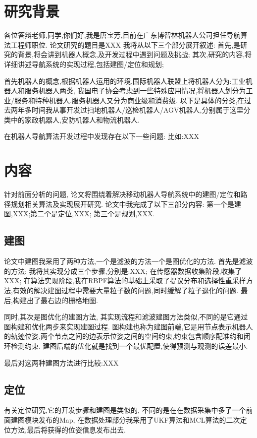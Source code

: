 \section{研究背景}
各位答辩老师,同学,你们好,我是唐宝芳,目前在广东博智林机器人公司担任导航算法工程师职位.
论文研究的题目是XXX \qquad
我将从以下三个部分展开叙述:
首先,是研究的背景,将会讲到机器人概念,及开发过程中遇到问题及挑战;
其次,研究的内容,将详细讲述导航系统的实现过程,包括建图/定位和规划;

首先机器人的概念,根据机器人运用的环境,国际机器人联盟上将机器人分为:工业机器人和服务机器人两类,
我国电子协会考虑到一些特殊应用情况,将机器人划分为工业/服务和特种机器人.服务机器人又分为商业级和消费级.
以下是具体的分类,在过去两年多时间我从事开发过扫地机器人/巡检机器人/AGV机器人,分别属于这里分类中的家政机器人,安防机器人和物流机器人.


在机器人导航算法开发过程中发现存在以下一些问题:
比如:XXX


\section{内容}


针对前面分析的问题,
论文将围绕着解决移动机器人导航系统中的建图/定位和路径规划相关算法及实现展开研究.
论文中我完成了以下三部分内容:
第一个是建图,XXX;\qquad 第二个是定位,XXX; \qquad 第三个是规划,XXX.

\subsection{建图}
论文中建图我采用了两种方法,一个是滤波的方法一个是图优化的方法.
首先是滤波的方法:
我将其实现分成三个步骤,分别是:XXX;\qquad
在传感器数据收集阶段,收集了XXX;\qquad 
在算法实现阶段,我在RBPF算法的基础上采取了提议分布和选择性重采样方法,有效的解决建图过程中需要大量粒子数的问题,同时缓解了粒子退化的问题.
最后,构建出了最右边的栅格地图.

同时,其次是图优化的建图方法,
其实现流程和滤波建图方法类似,不同的是它通过图构建和优化两步来实现建图过程.
图构建也称为建图前端,它是用节点表示机器人的轨迹位姿,两个节点之间的边表示位姿之间的空间约束,约束包含顺序配准约和闭环检测约束.
建图后端的优化就是找到一个最优配置,使得预测与观测的误差最小.

最后对这两种建图方法进行比较:XXX

\subsection{定位}

有关定位研究,它的开发步骤和建图是类似的,
不同的是在在数据采集中多了一个前面建图模块发布的Map,
在数据处理部分我采用了UKF算法和MCL算法的二次定位方法,最后将获得的位姿信息发布出去.


